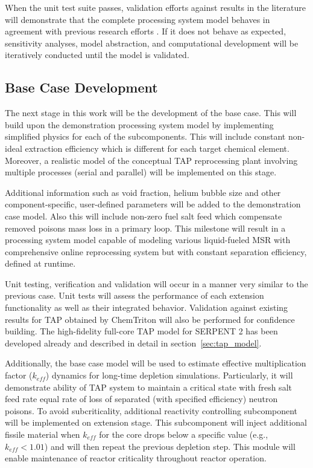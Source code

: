 When the unit test suite passes, validation efforts against results 
in the literature will demonstrate that the complete 
processing system model behaves in agreement with previous research 
efforts \cite{rykhlevskii_advanced_2018, rykhlevskii_modeling_2019}. 
If it does not behave as expected, sensitivity analyses, 
model abstraction, and computational development will be iteratively 
conducted until the model is validated.

\subsection{Base Case Development}
The next stage in this work will be the development of the base case. 
This will build upon the demonstration processing system model by 
implementing simplified physics for each of the subcomponents. This 
will include constant non-ideal extraction efficiency which is 
different for each target chemical element. Moreover, a realistic 
model of the conceptual \gls{TAP} reprocessing plant involving 
multiple processes (serial and parallel) will be implemented on this 
stage. 

Additional information such as void fraction, helium 
bubble size and other component-specific, user-defined 
parameters will be added to the demonstration case model.
Also this will include non-zero fuel salt feed which 
compensate removed poisons mass loss in a primary loop.
This milestone will result in a processing system model capable of 
modeling various liquid-fueled \gls{MSR} with comprehensive 
online reprocessing system but with constant separation efficiency, 
defined at runtime.

Unit testing, verification and validation will occur in a manner 
very similar to the previous case. Unit tests will assess the 
performance of each extension functionality as well as their 
integrated behavior. Validation against existing results for 
\gls{TAP} obtained by ChemTriton \cite{betzler_two-dimensional_2016, 
betzler_molten_2017} will also be performed for confidence 
building. The high-fidelity full-core \gls{TAP} model for 
SERPENT 2 has been developed already and described in detail 
in section~\ref{sec:tap_model}.

Additionally, the base case model will be used to estimate effective 
multiplication factor ($k_{eff}$) dynamics for long-time 
depletion simulations. Particularly, it will demonstrate 
ability of \gls{TAP} system to maintain a critical state with 
fresh salt feed rate equal rate of loss 
of separated (with specified efficiency) neutron poisons. 
To avoid subcriticality, additional reactivity 
controlling subcomponent 
will be implemented on extension stage. This subcomponent 
will inject additional fissile material 
when $k_{eff}$ for the core drops below a specific value (e.g., 
$k_{eff}<1.01$) and will then repeat the previous depletion step. 
This module will enable maintenance of reactor criticality 
throughout reactor operation.
 
